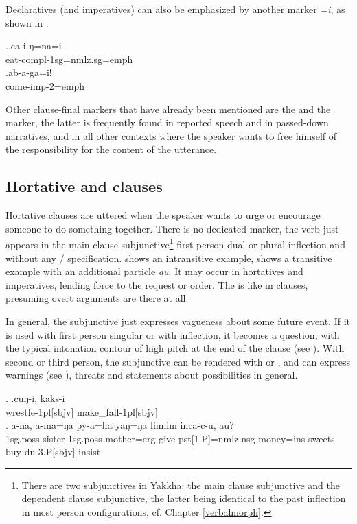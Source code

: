 Declaratives (and imperatives) can also be emphasized by another marker \emph{=i}, as shown in \Next. 

\ex.\ag.ca-i-ŋ=na=i\\
eat{\sc -compl-1sg=nmlz.sg=emph}\\
 
\bg.ab-a-ga=i!\\
come{\sc -imp-2=emph}\\

Other clause-final markers that have already been mentioned are the  and the  marker, the latter is frequently found in reported speech and in passed-down narratives, and in all other contexts where the speaker wants to free himself of the responsibility for the content of the utterance.

 
\subsection{Hortative and  clauses}\label{clstr-opt}
 
Hortative clauses are uttered when the speaker wants to urge or encourage someone to do something together. There is no dedicated  marker, the verb just appears in the main clause subjunctive\footnote{There are two subjunctives in Yakkha: the main clause subjunctive and the dependent clause subjunctive, the latter being  identical to the past inflection in most person configurations, cf. Chapter \ref{verbalmorph}.}  first person dual or plural inflection and without any / specification. \Next[a] shows an intransitive example, \Next[b] shows a transitive example with an additional particle \emph{au}. It may occur in hortatives and imperatives, lending force to the request or order.  The  is like in  clauses, presuming  overt arguments are there at all.

In general, the subjunctive just expresses vagueness about some future event. If it is used with first person singular or with  inflection, it becomes a  question, with the typical intonation contour of high pitch at the end of the clause (see \NNext[a]). With second or third person,  the subjunctive can be rendered with  or , and can express warnings (see \NNext[b]), threats \NNext[c] and statements about possibilities in general. 

\ex. \ag.cuŋ-i,    kaks-i\\
wrestle{\sc -1pl[sbjv]} make\_fall{\sc -1pl[sbjv]}\\
 
\bg. a-na,     a-ma=ŋa                py-a=ha   yaŋ=ŋa    limlim inca-c-u,       au?\\
{\sc 1sg.poss-}sister {\sc 1sg.poss-}mother{\sc =erg} give{\sc -pst[1.P]=nmlz.nsg} money{\sc =ins} sweets buy{\sc -du-3.P[sbjv]} {\sc insist}\\
 

